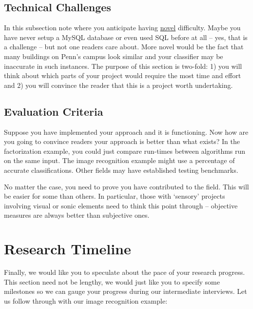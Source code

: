 \documentclass{sig-alternate}
\begin{document}
\subsection{Technical Challenges}
\label{subsec:tech_challenges}
In this subsection note where you anticipate having \underline{novel}
difficulty. Maybe you have never setup a MySQL database or even used
SQL before at all -- yes, that is a challenge -- but not one readers
care about. More novel would be the fact that many buildings on Penn's
campus look similar and your classifier may be inaccurate in such
instances. The purpose of this section is two-fold: 1) you will think
about which parts of your project would require the most time and
effort and 2) you will convince the reader that this is a project
worth undertaking.

\subsection{Evaluation Criteria}
\label{subsec:eval_criteria}
Suppose you have implemented your approach and it is functioning. Now
how are you going to convince readers your approach is better than
what exists? In the factorization example, you could just compare
run-times between algorithms run on the same input. The image
recognition example might use a percentage of accurate
classifications. Other fields may have established testing benchmarks.

No matter the case, you need to prove you have contributed to the
field. This will be easier for some than others. In particular, those
with `sensory' projects involving visual or sonic elements need to
think this point through -- objective measures are always better than
subjective ones.

\section{Research Timeline}
\label{sec:research_timeline}
Finally, we would like you to speculate about the pace of your
research progress. This section need not be lengthy, we would just
like you to specify some milestones so we can gauge your progress
during our intermediate interviews. Let us follow through with our
image recognition example:
\end{document}

